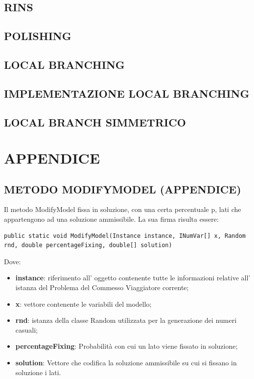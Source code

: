 \documentclass[11pt]{article}
\begin{document}
\subsection*{RINS}

\subsection*{POLISHING}

\subsection*{LOCAL BRANCHING}

\subsection*{IMPLEMENTAZIONE LOCAL BRANCHING}

\subsection*{LOCAL BRANCH SIMMETRICO}

\section*{APPENDICE}

\subsection*{METODO MODIFYMODEL (APPENDICE)}

Il metodo ModifyModel fissa in soluzione, con una certa percentuale p, lati che appartengono ad una soluzione ammissibile. La sua firma risulta essere:

\begin{lstlisting} 
public static void ModifyModel(Instance instance, INumVar[] x, Random rnd, double percentageFixing, double[] solution)
\end{lstlisting}

Dove:

\begin{itemize}
    \item \textbf{instance}: riferimento all' oggetto contenente tutte le informazioni relative all' istanza del Problema del Commesso Viaggiatore corrente;
    \item \textbf{x}: vettore contenente le variabili del modello;
    \item \textbf{rnd}: istanza della classe Random utilizzata per la generazione dei numeri casuali;
    \item \textbf{percentageFixing}: Probabilità con cui un lato viene fissato in soluzione;
    \item \textbf{solution}: Vettore che codifica la soluzione ammissibile su cui si fissano in soluzione i lati.
\end{itemize}
\end{document}
